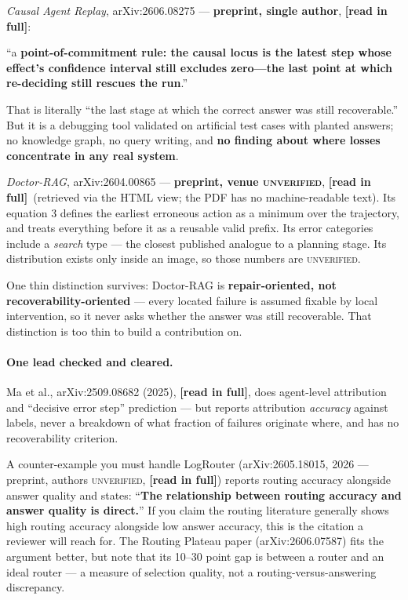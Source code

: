 \documentclass[11pt,a4paper]{article}
\newcommand{\readtag}{\textcolor{standing}{\textbf{[read in full]}}}
\newcommand{\unver}{\textcolor{killed}{\textsc{unverified}}}
\begin{document}
\emph{Causal Agent Replay}, arXiv:2606.08275 --- \textbf{preprint, single author},
\readtag:

\begin{quotebox}
``a \textbf{point-of-commitment rule: the causal locus is the latest step whose
effect's confidence interval still excludes zero---the last point at which
re-deciding still rescues the run}.''
\end{quotebox}

That is literally ``the last stage at which the correct answer was still
recoverable.'' But it is a debugging tool validated on artificial test cases with
planted answers; no knowledge graph, no query writing, and \textbf{no finding about
where losses concentrate in any real system}.

\emph{Doctor-RAG}, arXiv:2604.00865 --- \textbf{preprint, venue \unver}, \readtag\
(retrieved via the HTML view; the PDF has no machine-readable text). Its equation 3
defines the earliest erroneous action as a minimum over the trajectory, and treats
everything before it as a reusable valid prefix. Its error categories include a
\emph{search} type --- the closest published analogue to a planning stage. Its
distribution exists only inside an image, so those numbers are \unver.

One thin distinction survives: Doctor-RAG is \textbf{repair-oriented, not
recoverability-oriented} --- every located failure is assumed fixable by local
intervention, so it never asks whether the answer was still recoverable. That
distinction is too thin to build a contribution on.

\paragraph{One lead checked and cleared.} Ma et al., arXiv:2509.08682 (2025),
\readtag, does agent-level attribution and ``decisive error step'' prediction --- but
reports attribution \emph{accuracy} against labels, never a breakdown of what
fraction of failures originate where, and has no recoverability criterion.

\begin{alertbox}{A counter-example you must handle}
LogRouter (arXiv:2605.18015, 2026 --- preprint, authors \unver, \readtag) reports
routing accuracy alongside answer quality and states: ``\textbf{The relationship
between routing accuracy and answer quality is direct.}'' If you claim the routing
literature generally shows high routing accuracy alongside low answer accuracy,
this is the citation a reviewer will reach for. The Routing Plateau paper
(arXiv:2606.07587) fits the argument better, but note that its 10--30 point gap is
between a router and an ideal router --- a measure of selection quality, not a
routing-versus-answering discrepancy.
\end{alertbox}
\end{document}
